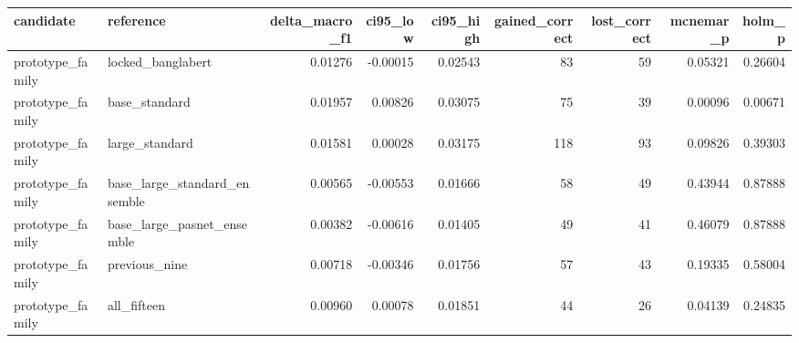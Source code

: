 \begin{tabular}{llrrrrrrr}
\toprule
candidate & reference & delta\_macro\_f1 & ci95\_low & ci95\_high & gained\_correct & lost\_correct & mcnemar\_p & holm\_p \\
\midrule
prototype\_family & locked\_banglabert & 0.01276 & -0.00015 & 0.02543 & 83 & 59 & 0.05321 & 0.26604 \\
prototype\_family & base\_standard & 0.01957 & 0.00826 & 0.03075 & 75 & 39 & 0.00096 & 0.00671 \\
prototype\_family & large\_standard & 0.01581 & 0.00028 & 0.03175 & 118 & 93 & 0.09826 & 0.39303 \\
prototype\_family & base\_large\_standard\_ensemble & 0.00565 & -0.00553 & 0.01666 & 58 & 49 & 0.43944 & 0.87888 \\
prototype\_family & base\_large\_pasnet\_ensemble & 0.00382 & -0.00616 & 0.01405 & 49 & 41 & 0.46079 & 0.87888 \\
prototype\_family & previous\_nine & 0.00718 & -0.00346 & 0.01756 & 57 & 43 & 0.19335 & 0.58004 \\
prototype\_family & all\_fifteen & 0.00960 & 0.00078 & 0.01851 & 44 & 26 & 0.04139 & 0.24835 \\
\bottomrule
\end{tabular}
